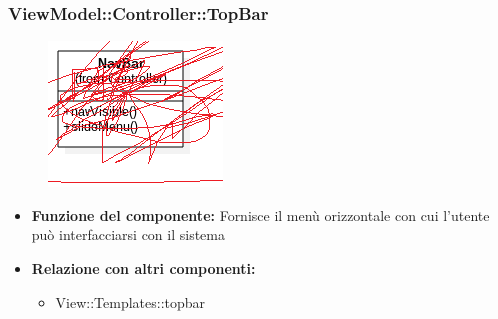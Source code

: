  \subsubsection{ViewModel::Controller::TopBar}
 \begin{figure}[h!]
\begin{center}
	\includegraphics[scale=0.4]{../images/ViewModel/Controller/TopBar.png}
\end{center}
\end{figure}
 \begin{itemize}
 \item\textbf{Funzione del componente:} Fornisce il menù orizzontale con cui l'utente può interfacciarsi con il sistema
 \item\textbf{Relazione con altri componenti:}
 \begin{itemize}
 	\item View::Templates::topbar
 \end{itemize}
 \end{itemize}
\newpage
 
